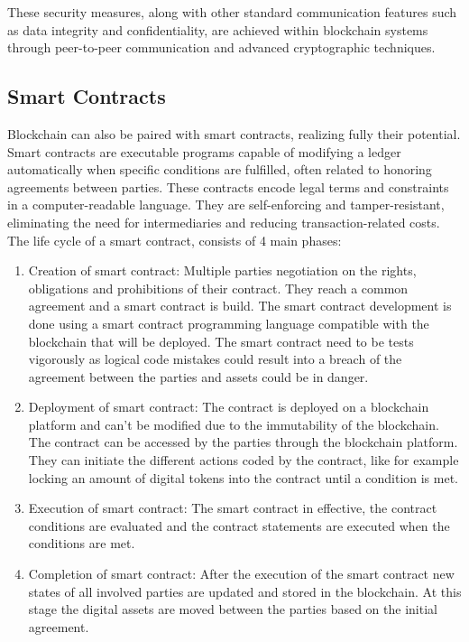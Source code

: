 These security measures, along with other standard communication features such as data integrity and confidentiality, are achieved within blockchain systems through peer-to-peer
communication and advanced cryptographic techniques. \cite{andoni2019blockchain}

\subsection{Smart Contracts}
Blockchain can also be paired with smart contracts, realizing fully their potential. Smart contracts are executable programs capable of modifying a ledger automatically when specific
conditions are fulfilled, often related to honoring agreements between parties. These contracts encode legal terms and constraints in a computer-readable language. They are
self-enforcing and tamper-resistant, eliminating the need for intermediaries and reducing transaction-related costs. \cite{andoni2019blockchain} \\
The life cycle of a smart contract, consists of 4 main phases: \cite{ZHENG2020475}
\begin{enumerate}
    \item Creation of smart contract: Multiple parties negotiation on the rights, obligations and prohibitions of their contract. They reach a common agreement and a smart contract is
          build. The smart contract development is done using a smart contract programming language compatible with the blockchain that will be deployed. The smart contract need to be tests
          vigorously as logical code mistakes could result into a breach of the agreement between the parties and assets could be in danger.
    \item Deployment of smart contract: The contract is deployed on a blockchain platform and can't be modified due to the immutability of the blockchain. The contract can be accessed
          by the parties through the blockchain platform. They can initiate the different actions coded by the contract, like for example locking an amount of digital tokens into the contract
          until a condition is met.
    \item Execution of smart contract: The smart contract in effective, the contract conditions are evaluated and the contract statements are executed when the conditions are met.
    \item Completion of smart contract: After the execution of the smart contract new states of all involved parties are updated and stored in the blockchain. At this stage the digital
          assets are moved between the parties based on the initial agreement.
\end{enumerate}
